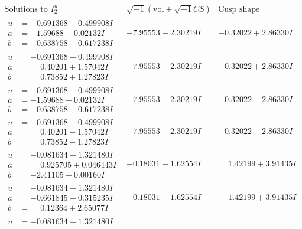 \documentclass[1p]{elsarticle_modified}
\theoremstyle{definition}
\newcommand{\I}{\sqrt{-1}}
\begin{document}
$$\begin{array}{c|c|c}  
\text{Solutions to }I^u_{2}& \I (\text{vol} + \sqrt{-1}CS) & \text{Cusp shape}\\
 \hline 
\begin{aligned}
u &= -0.691368 + 0.499908 I \\
a &= -1.59688 + 0.02132 I \\
b &= -0.638758 + 0.617238 I\end{aligned}
 & -7.95553 - 2.30219 I & -0.32022 + 2.86330 I \\ \hline\begin{aligned}
u &= -0.691368 + 0.499908 I \\
a &= \phantom{-}0.40201 + 1.57042 I \\
b &= \phantom{-}0.73852 + 1.27823 I\end{aligned}
 & -7.95553 - 2.30219 I & -0.32022 + 2.86330 I \\ \hline\begin{aligned}
u &= -0.691368 - 0.499908 I \\
a &= -1.59688 - 0.02132 I \\
b &= -0.638758 - 0.617238 I\end{aligned}
 & -7.95553 + 2.30219 I & -0.32022 - 2.86330 I \\ \hline\begin{aligned}
u &= -0.691368 - 0.499908 I \\
a &= \phantom{-}0.40201 - 1.57042 I \\
b &= \phantom{-}0.73852 - 1.27823 I\end{aligned}
 & -7.95553 + 2.30219 I & -0.32022 - 2.86330 I \\ \hline\begin{aligned}
u &= -0.081634 + 1.321480 I \\
a &= \phantom{-}0.925705 + 0.046443 I \\
b &= -2.41105 - 0.00160 I\end{aligned}
 & -0.18031 - 1.62554 I & \phantom{-}1.42199 + 3.91435 I \\ \hline\begin{aligned}
u &= -0.081634 + 1.321480 I \\
a &= -0.661845 + 0.315235 I \\
b &= \phantom{-}0.12364 + 2.65077 I\end{aligned}
 & -0.18031 - 1.62554 I & \phantom{-}1.42199 + 3.91435 I \\ \hline\begin{aligned}
u &= -0.081634 - 1.321480 I \\

\end{aligned}
\end{array}$$
\end{document}
